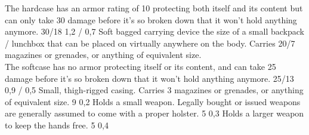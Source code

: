 \begin{multicols}{2}
{        The hardcase has an armor rating of 10 protecting
        both itself and its content
        but can only take 30 damage before it's so broken down
        that it won't hold anything anymore.}
    {30/18}
    {1,2 / 0,7}
    {Soft bagged carrying device the size of
        a small backpack / lunchbox that can be placed on virtually anywhere on the body.
        Carries 20/7 magazines or grenades, or anything of equivalent size.\\
        The softcase has no armor protecting itself or its content,
        and can take 25 damage before it's so broken down
        that it won't hold anything anymore.}
    {25/13}
    {0,9 / 0,5}
    {Small, thigh-rigged casing.
        Carries 3 magazines or grenades, or anything of equivalent size.}
    {9}
    {0,2}
    {Holds a small weapon.
        Legally bought or issued weapons are generally assumed to come with a proper holster.}
    {5}
    {0,3}
    {Holds a larger weapon to keep the hands free.}
    {5}
    {0,4}
\end{multicols}

